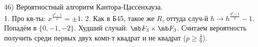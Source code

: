 46) Вероятностный алгоритм Кантора-Цассенхауза.\\
1. Про кв-ты: $x^{\frac{q^d-1}{2}}=\pm 1$. 2. Как в Б45, такое же $R$, оттуда случ-й $h \rightarrow h^\frac{q^d-1}{2}-1$. Попадём в $\{0, -1, -2\}$. Худший случай: $\mb F_3 \times \mb F_3$. Считаем вероятность получить среди первых двух комп-т квадрат и не квадрат ($p\ge \frac{4}{9}$).\\
